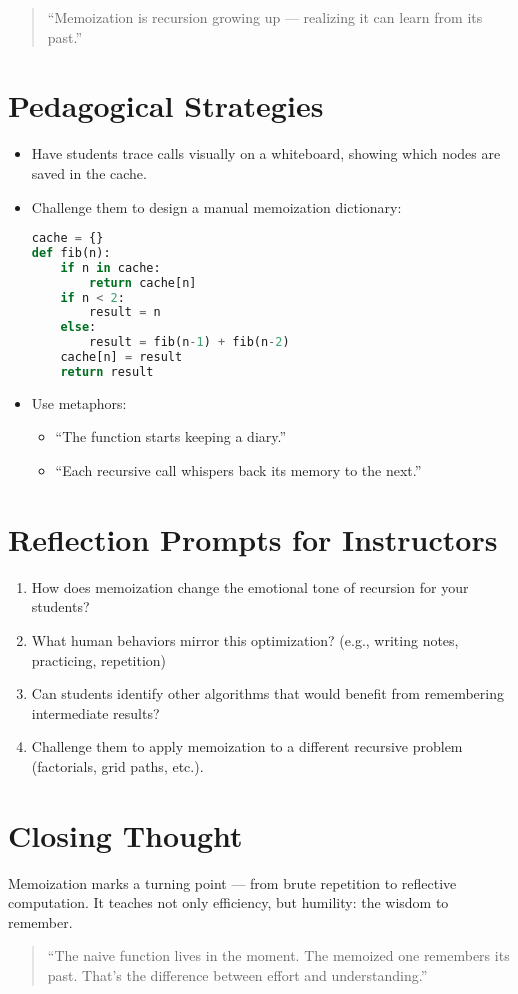\begin{quote}
“Memoization is recursion growing up — realizing it can learn from its past.”
\end{quote}

\section*{Pedagogical Strategies}
\begin{itemize}
  \item Have students trace calls visually on a whiteboard, showing which nodes are saved in the cache.
  \item Challenge them to design a manual memoization dictionary:
\begin{lstlisting}[language=Python]
cache = {}
def fib(n):
    if n in cache:
        return cache[n]
    if n < 2:
        result = n
    else:
        result = fib(n-1) + fib(n-2)
    cache[n] = result
    return result
\end{lstlisting}
  \item Use metaphors:  
    \begin{itemize}
      \item “The function starts keeping a diary.”  
      \item “Each recursive call whispers back its memory to the next.”  
    \end{itemize}
\end{itemize}

\section*{Reflection Prompts for Instructors}
\begin{enumerate}
  \item How does memoization change the emotional tone of recursion for your students?
  \item What human behaviors mirror this optimization? (e.g., writing notes, practicing, repetition)
  \item Can students identify other algorithms that would benefit from remembering intermediate results?
  \item Challenge them to apply memoization to a different recursive problem (factorials, grid paths, etc.).
\end{enumerate}

\section*{Closing Thought}
Memoization marks a turning point — from brute repetition to reflective computation.  
It teaches not only efficiency, but humility: the wisdom to remember.

\begin{quote}
“The naive function lives in the moment.  
The memoized one remembers its past.  
That’s the difference between effort and understanding.”
\end{quote}


